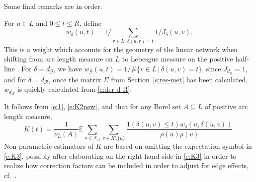\documentclass[alpha-refs]{wiley-article}
\begin{document}



Some final remarks are in order. 

For $u\in L$ and $0\le t\le R$, define
\[w_\delta(u,t)=1\bigg/\sum_{v\in L:\, \delta(u,v)=t}1/J_\delta(u,v).\]
This is a weight which accounts for the geometry of the linear network when shifting from arc length measure on $L$ to Lebesgue measure on the positive half-line \citep[][Propositions 1 and 2]{RakshitEtAl}. 
For $\delta=d_{\mathcal{G}}$, we have 
$w_{\mathcal G}(u,t)=1/\#\{v\in L\,|\,\delta(u,v)=t\}$, since $J_{d_\mathcal{G}}=1$, and  
for $\delta=d_{\mathcal{R}}$, once the matrix $\Sigma$ from Section~\ref{s:res-met} has been calculated, $w_{d_{\mathcal{R}}}$ is quickly calculated from \eqref{e:der-d-R}.

It follows from \eqref{e:1}, \eqref{e:K2new}, and \citet[][Equation (8)]{RakshitEtAl}  that 
for any Borel set $A\subseteq L$ of positive arc length measure, %
\begin{equation}
K(t)=
\frac{1}{\nu_L(A)}\mathbb E\sum_{u\in X_A}\sum_{v\in X\setminus\{u\}}\frac{1(\delta(u,v)\le t)w_\delta(u,\delta(u,v))}{\rho(u)\rho(v)}.
\label{e:K3}
\end{equation}
Non-parametric estimators of $K$ are based on omitting the expectation symbol in \eqref{e:K3}, possibly after elaborating on the right hand side in \eqref{e:K3} in order to realize how correction factors can be included in order to adjust for edge effects, cf.\ \citet{RakshitEtAl}.
 
\end{document}
